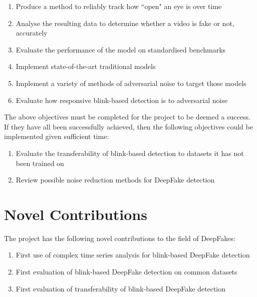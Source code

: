 \begin{enumerate}
    \item Produce a method to reliably track how ``open" an eye is over time
    \item Analyse the resulting data to determine whether a video is fake or not, accurately
    \item Evaluate the performance of the model on standardised benchmarks
    \item Implement state-of-the-art traditional models
    \item Implement a variety of methods of adversarial noise to target those models
    \item Evaluate how responsive blink-based detection is to adversarial noise
\end{enumerate}

The above objectives must be completed for the project to be deemed a success. If they have all been successfully achieved, then the following objectives could be implemented given sufficient time:

\begin{enumerate}
    \item Evaluate the transferability of blink-based detection to datasets it has not been trained on
    \item Review possible noise reduction methods for DeepFake detection
\end{enumerate}

\section{Novel Contributions}
\label{sec:novel}

The project has the following novel contributions to the field of DeepFakes:

\begin{enumerate}
    \item First use of complex time series analysis for blink-based DeepFake detection
    \item First evaluation of blink-based DeepFake detection on common datasets
    \item First evaluation of transferability of blink-based DeepFake detection
\end{enumerate}